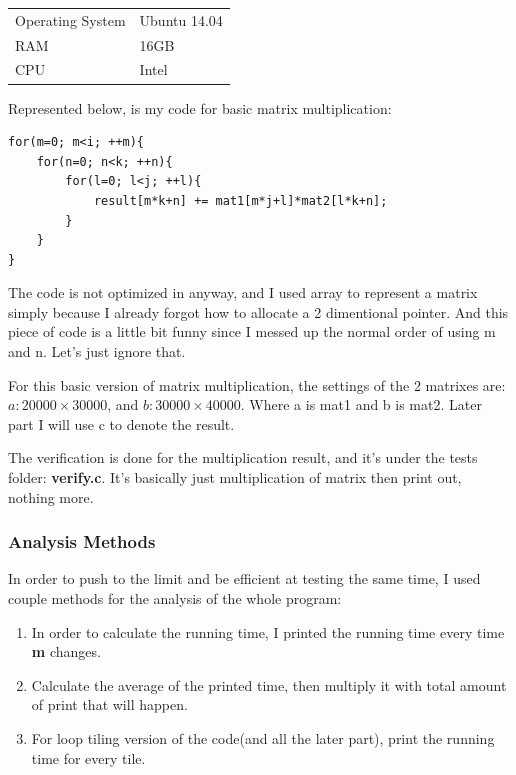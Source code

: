 \documentclass[11pt]{article}
\begin{document}
\begin{center}
\begin{tabular}{ll}
\hline
Operating System & Ubuntu 14.04\\
RAM & 16GB\\
CPU & Intel\\
\hline
\end{tabular}
\end{center}




Represented below, is my code for basic matrix multiplication:
\begin{verbatim}
for(m=0; m<i; ++m){
    for(n=0; n<k; ++n){
        for(l=0; l<j; ++l){
            result[m*k+n] += mat1[m*j+l]*mat2[l*k+n];
        }
    }
}
\end{verbatim}
The code is not optimized in anyway, and I used array to represent a matrix simply 
because I already forgot how to allocate a 2 dimentional pointer. And this piece of code
is a little bit funny since I messed up the normal order of using m and n. Let's just
ignore that.

For this basic version of matrix multiplication, the settings of the 2 matrixes are:
\(a: 20000\times 30000\),
and \(b: 30000\times 40000\). Where a is mat1 and b is mat2. Later part I will use c to denote the result. 

The verification is done for the multiplication result, and it's under the 
tests folder: \textbf{verify.c}. It's basically just multiplication of matrix then print 
out, nothing more.



\subsubsection{Analysis Methods}
\label{sec:orgheadline2}
In order to push to the limit and be efficient at testing the same time, I used couple methods for the analysis of the whole program:
\begin{enumerate}
\item In order to calculate the running time, I printed the running time  every time \textbf{m} changes.
\item Calculate the average of the printed time, then multiply it with total amount of print that will happen.
\item For loop tiling version of the code(and all the later part), print the running time for every tile.
\end{enumerate}
\end{document}
